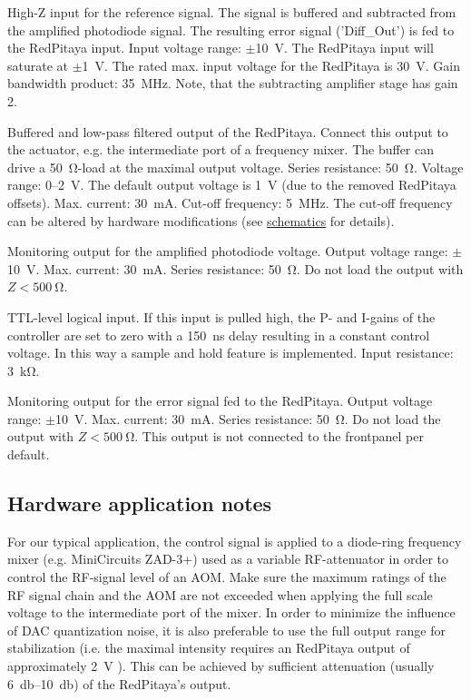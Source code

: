 \documentclass[twoside,a4paper]{refart}
\begin{document}
High-Z input for the reference signal. The signal is buffered and subtracted from the amplified photodiode signal. The resulting error signal ('Diff\_Out') is fed to the RedPitaya input. Input voltage range:  $\pm$\SI{10}{\volt}. The RedPitaya input will saturate at $\pm$\SI{1}{\volt}. The rated max. input voltage for the RedPitaya is \SI{30}{\volt}. Gain bandwidth product: \SI{35}{\mega\hertz}. Note, that the subtracting amplifier stage has gain 2.

Buffered and low-pass filtered output of the RedPitaya. Connect this output to the actuator, e.g. the intermediate port of a frequency mixer. The buffer can drive a \SI{50}{\ohm}-load at the maximal output voltage. Series resistance: \SI{50}{\ohm}.  Voltage range: 0--\SI{2}{\volt}. The default output voltage is \SI{1}{\volt} (due to the removed RedPitaya offsets).  Max. current: \SI{30}{\milli\ampere}. Cut-off frequency: \SI{5}{\mega\hertz}. The cut-off frequency can be altered by hardware modifications (see \href{https://github.com/TU-Darmstadt-APQ/RedPitaya-IntStab/tree/master/pcb}{schematics} for details).

Monitoring output for the amplified photodiode voltage. Output voltage range: $\pm$\SI{10}{\volt}. Max. current: \SI{30}{\milli\ampere}. Series resistance: \SI{50}{\ohm}. Do not load the output with $Z < \SI{500}{\ohm}$.

TTL-level logical input. If this input is pulled high, the P- and I-gains of the controller are set to zero with a \SI{150}{\nano\second} delay resulting in a constant control voltage. In this way a sample and hold feature is implemented. Input resistance: \SI{3}{\kilo\ohm}.

 
Monitoring output for the error signal fed to the RedPitaya. Output voltage range: $\pm$\SI{10}{\volt}. Max. current: \SI{30}{\milli\ampere}. Series resistance: \SI{50}{\ohm}. Do not load the output with $Z < \SI{500}{\ohm}$. This output is not connected to the frontpanel per default.



\subsection{Hardware application notes \label{sec:app_note}}



 
For our typical application, the control signal is applied to a diode-ring frequency mixer (e.g. MiniCircuits ZAD-3+) used as a variable RF-attenuator in order to control the RF-signal level of an AOM. Make sure the maximum ratings of the RF signal chain and the AOM are not exceeded when applying the full scale voltage to the intermediate port of the mixer. In order to minimize the influence of DAC quantization noise, it is also preferable to use the full output range for stabilization (i.e. the maximal intensity requires an RedPitaya output of approximately \SI{2}{\volt} ). This can be achieved by sufficient attenuation (usually \SIrange{6}{10}{\decibel}) of the RedPitaya's output.
\end{document}
